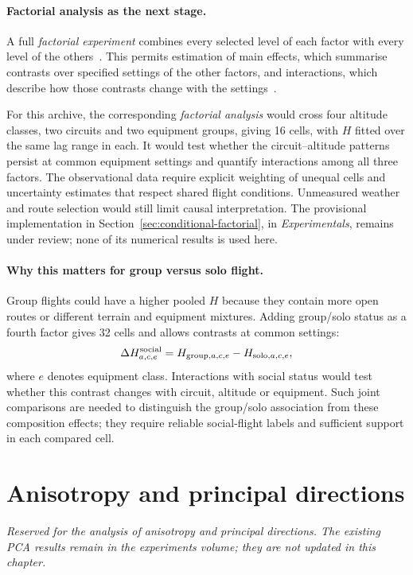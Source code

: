 \paragraph{Factorial analysis as the next stage.}
A full \emph{factorial experiment} combines every selected level of each
factor with every level of the others~\cite{nist_full_factorial}. This permits
estimation of main effects, which summarise contrasts over specified settings
of the other factors, and interactions, which describe how those contrasts
change with the settings~\cite[Sections~9.3 and~9.7]{mohr2022statistical}.

For this archive, the corresponding \emph{factorial analysis} would cross
four altitude classes, two circuits and two equipment groups, giving 16
cells, with $H$ fitted over the same lag range in each. It would test whether
the circuit--altitude patterns persist at common equipment settings and
quantify interactions among all three factors. The observational data require
explicit weighting of unequal cells and uncertainty estimates that respect
shared flight conditions. Unmeasured weather and route selection would still
limit causal interpretation. The provisional implementation in
Section~\ref{sec:conditional-factorial}, in \emph{Experimentals}, remains under
review; none of its numerical results is used here.

\paragraph{Why this matters for group versus solo flight.}
Group flights could have a higher pooled $H$ because they contain more open
routes or different terrain and equipment mixtures. Adding group/solo status
as a fourth factor gives 32 cells and allows contrasts at common settings:
\[
 \Delta H_{a,c,e}^{\rm social}
 =H_{\mathrm{group},a,c,e}-H_{\mathrm{solo},a,c,e},
\]
where $e$ denotes equipment class. Interactions with social status would test
whether this contrast changes with circuit, altitude or equipment. Such joint
comparisons are needed to distinguish the group/solo association from these
composition effects; they require reliable social-flight labels and sufficient
support in each compared cell.
\FloatBarrier

\section{Anisotropy and principal directions}
\label{sec:fixed-anisotropy}
\emph{Reserved for the analysis of anisotropy and principal directions. The existing
PCA results remain in the experiments volume; they are not updated in this chapter.}
